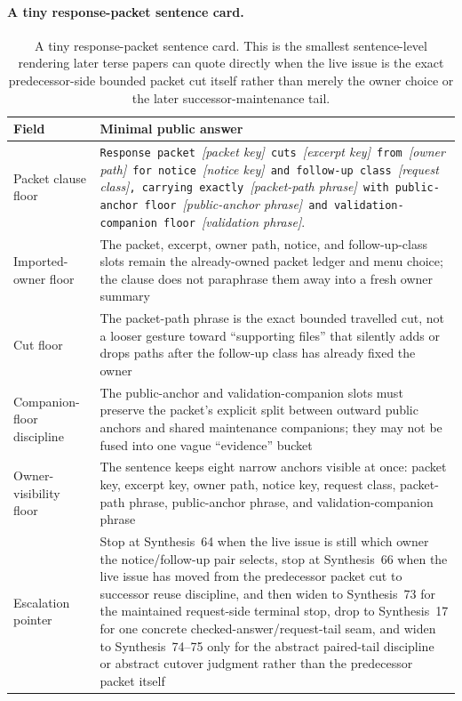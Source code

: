 \documentclass[11pt]{article}
\begin{document}
\paragraph{A tiny response-packet sentence card.}
\begin{table}[t]
\centering
\small
\begin{tabularx}{\linewidth}{@{}Z Y@{}}
\toprule
Field & Minimal public answer \\
\midrule
Packet clause floor & \texttt{Response packet }\emph{[packet key]}\texttt{ cuts }\emph{[excerpt key]}\texttt{ from }\emph{[owner path]}\texttt{ for notice }\emph{[notice key]}\texttt{ and follow-up class }\emph{[request class]}\texttt{, carrying exactly }\emph{[packet-path phrase]}\texttt{ with public-anchor floor }\emph{[public-anchor phrase]}\texttt{ and validation-companion floor }\emph{[validation phrase]}. \\
Imported-owner floor & The packet, excerpt, owner path, notice, and follow-up-class slots remain the already-owned packet ledger and menu choice; the clause does not paraphrase them away into a fresh owner summary \\
Cut floor & The packet-path phrase is the exact bounded travelled cut, not a looser gesture toward ``supporting files'' that silently adds or drops paths after the follow-up class has already fixed the owner \\
Companion-floor discipline & The public-anchor and validation-companion slots must preserve the packet's explicit split between outward public anchors and shared maintenance companions; they may not be fused into one vague ``evidence'' bucket \\
Owner-visibility floor & The sentence keeps eight narrow anchors visible at once: packet key, excerpt key, owner path, notice key, request class, packet-path phrase, public-anchor phrase, and validation-companion phrase \\
Escalation pointer & Stop at Synthesis~64 when the live issue is still which owner the notice/follow-up pair selects, stop at Synthesis~66 when the live issue has moved from the predecessor packet cut to successor reuse discipline, and then widen to Synthesis~73 for the maintained request-side terminal stop, drop to Synthesis~17 for one concrete checked-answer/request-tail seam, and widen to Synthesis~74--75 only for the abstract paired-tail discipline or abstract cutover judgment rather than the predecessor packet itself \\
\bottomrule
\end{tabularx}
\caption{A tiny response-packet sentence card. This is the smallest sentence-level rendering later terse papers can quote directly when the live issue is the exact predecessor-side bounded packet cut itself rather than merely the owner choice or the later successor-maintenance tail.}
\label{tab:tiny-response-packet-sentence-card}
\end{table}
\end{document}
